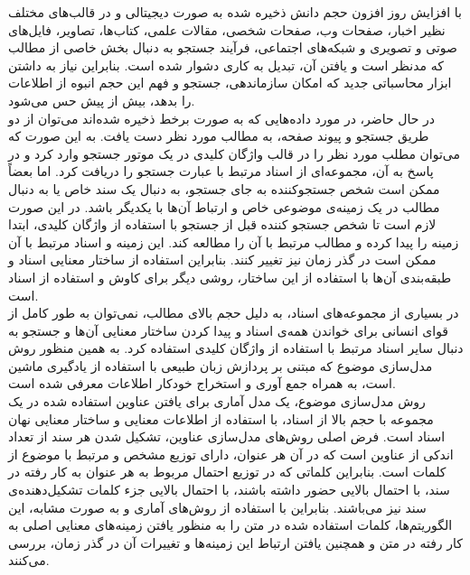 
با افزایش روز افزون حجم دانش ذخیره شده به صورت دیجیتالی و در قالب‌های مختلف نظیر اخبار، صفحات وب، صفحات شخصی، مقالات علمی، کتاب‌ها، تصاویر، فایل‌های صوتی و تصویری و شبکه‌های اجتماعی، فرآیند جستجو به دنبال بخش خاصی از مطالب که مدنظر است و یافتن آن، تبدیل به کاری دشوار شده است. بنابراین نیاز به داشتن ابزار محاسباتی جدید که امکان سازماندهی، جستجو و فهم این حجم انبوه از اطلاعات را بدهد، بیش از پیش حس می‌شود.
\\
در حال حاضر، در مورد داده‌هایی که به صورت برخط ذخیره شده‌اند می‌توان از دو طریق جستجو و پیوند صفحه، به مطالب مورد نظر دست یافت. به این صورت که می‌توان مطلب مورد نظر را در قالب واژگان کلیدی در یک موتور جستجو وارد کرد و در پاسخ به آن، مجموعه‌ای از اسناد مرتبط با عبارت جستجو را دریافت کرد. اما بعضاً ممکن است شخص جستجوکننده به جای جستجو، به دنبال یک سند خاص یا به دنبال مطالب در یک زمینه‌ی موضوعی خاص و ارتباط آن‌ها با یکدیگر باشد. در این صورت لازم است تا شخص جستجو کننده قبل از جستجو با استفاده از واژگان کلیدی، ابتدا زمینه را پیدا کرده و مطالب مرتبط با آن را مطالعه کند. این زمینه و اسناد مرتبط با آن ممکن است در گذر زمان نیز تغییر کنند. بنابراین استفاده از ساختار معنایی اسناد و طبقه‌بندی آن‌ها با استفاده از این ساختار، روشی دیگر برای کاوش و استفاده از اسناد است.
\\
در بسیاری از مجموعه‌های اسناد، به دلیل حجم بالای مطالب، نمی‌توان به طور کامل از قوای انسانی برای خواندن همه‌ی اسناد و پیدا کردن ساختار معنایی آن‌ها و جستجو به دنبال سایر اسناد مرتبط با استفاده از واژگان کلیدی استفاده کرد. به همین منظور روش مدل‌سازی موضوع که مبتنی بر پردازش زبان طبیعی با استفاده از یادگیری ماشین است، به همراه جمع آوری و استخراج خودکار اطلاعات معرفی شده است.
\\
روش مدل‌سازی موضوع، یک مدل آماری برای یافتن عناوین استفاده شده در یک مجموعه با حجم بالا از اسناد، با استفاده از اطلاعات معنایی و ساختار معنایی نهان اسناد است. فرض اصلی روش‌های مدل‌سازی عناوین، تشکیل شدن هر سند از تعداد اندکی از عناوین است که در آن هر عنوان، دارای توزیع مشخص و مرتبط با موضوع از کلمات است. بنابراین کلماتی که در توزیع احتمال مربوط به هر عنوان به کار رفته در سند، با احتمال بالایی حضور داشته باشند، با احتمال بالایی جزء کلمات تشکیل‌دهنده‌ی سند نیز می‌باشند. بنابراین با استفاده از روش‌های آماری و به صورت مشابه، این الگوریتم‌ها، کلمات استفاده شده در متن را به منظور یافتن زمینه‌های معنایی اصلی به کار رفته در متن و همچنین یافتن ارتباط این زمینه‌ها و تغییرات آن در گذر زمان، بررسی می‌کنند.